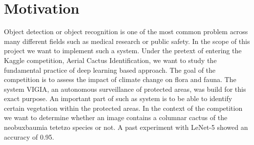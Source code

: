 \section{Motivation}
Object detection or object recognition is one of the most common problem across many different fields such as medical research or public safety. In the scope of this project we want to implement such a system. Under the pretext of entering the Kaggle competition, Aerial Cactus Identification, we want to study the fundamental practice of deep learning based approach. The goal of the competition is to assess the impact of climate change on flora and fauna. The system VIGIA, an autonomous surveillance of protected areas, was build for this exact purpose. An important part of such as system is to be able to identify certain vegetation within the protected areas. In the context of the competition we want to determine whether an image contains a columnar cactus of the neobuxbaumia tetetzo species or not. A past experiment with LeNet-5 showed an accuracy of 0.95.

